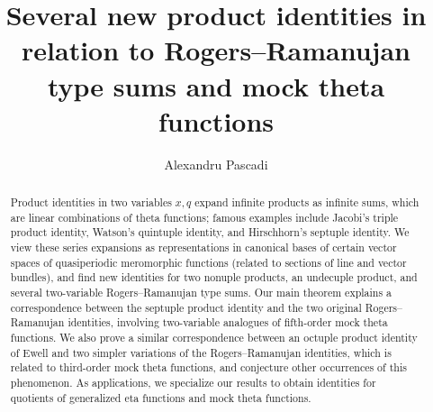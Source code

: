 \documentclass[reqno,11pt]{amsart}
\title[Several new product identities and  Rogers--Ramanujan type sums]{Several new product identities in relation to Rogers--Ramanujan type sums and mock theta functions}
\author[Alexandru Pascadi]{Alexandru Pascadi}
\theoremstyle{definition}
\theoremstyle{remark}
\numberwithin{equation}{section}
\begin{document}
\begin{abstract}
Product identities in two variables $x, q$ expand infinite products as infinite sums, which are linear combinations of theta functions; famous examples include Jacobi's triple product identity, Watson's quintuple identity, and Hirschhorn's septuple identity. We view these series expansions as representations in canonical bases of certain vector spaces of quasiperiodic meromorphic functions (related to sections of line and vector bundles), and find new identities for two nonuple products, an undecuple product, and several two-variable Rogers--Ramanujan type sums. Our main theorem explains a correspondence between the septuple product identity and the two original Rogers--Ramanujan identities, involving two-variable analogues of fifth-order mock theta functions. We also prove a similar correspondence between an octuple product identity of Ewell and two simpler variations of the Rogers--Ramanujan identities, which is related to third-order mock theta functions, and conjecture other occurrences of this phenomenon. As applications, we specialize our results to obtain identities for quotients of generalized eta functions and mock theta functions.
\end{abstract}

\maketitle
\end{document}
